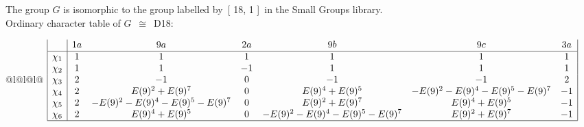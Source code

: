 \documentclass[varwidth=\maxdimen,border=10]{standalone}
\begin{document}
The group $G$ is isomorphic to the group labelled by\ [ 18, 1 ]\ in the Small Groups library.\\
Ordinary character table of $G$\ $\cong$\ D18:\\
\begin{center}
\begin{tabular}{@{}l@{}l@{}l@{}}
\hline
\(\begin{array}{|l|cccccc|}
  & 1a & 9a & 2a & 9b & 9c & 3a\\ \hline
\chi_{1} & 1 & 1 & 1 & 1 & 1 & 1\\
\chi_{2} & 1 & 1 & -1 & 1 & 1 & 1\\
\chi_{3} & 2 & -1 & 0 & -1 & -1 & 2\\
\chi_{4} & 2 & E(9)^{2}+E(9)^{7} & 0 & E(9)^{4}+E(9)^{5} & -E(9)^{2}-E(9)^{4}-E(9)^{5}-E(9)^{7} & -1\\
\chi_{5} & 2 & -E(9)^{2}-E(9)^{4}-E(9)^{5}-E(9)^{7} & 0 & E(9)^{2}+E(9)^{7} & E(9)^{4}+E(9)^{5} & -1\\
\chi_{6} & 2 & E(9)^{4}+E(9)^{5} & 0 & -E(9)^{2}-E(9)^{4}-E(9)^{5}-E(9)^{7} & E(9)^{2}+E(9)^{7} & -1\\
\hline
\end{array}\)\\
\end{tabular}
\end{center}
\end{document}
